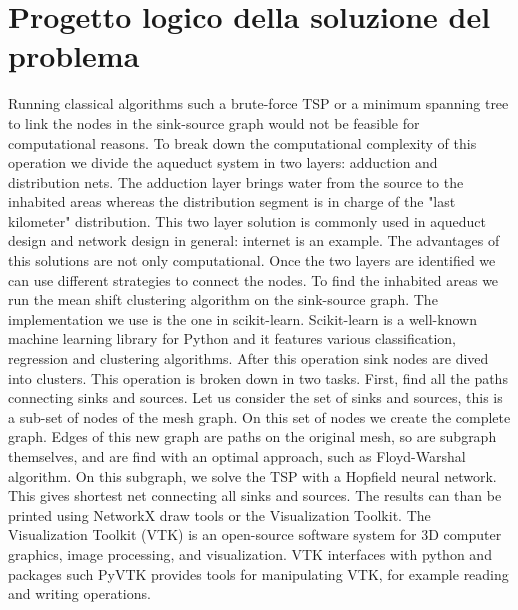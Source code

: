 \chapter{Progetto logico della soluzione del problema}
\label{capitolo4}
\thispagestyle{empty}



\noindent Running classical algorithms such a brute-force TSP or a minimum spanning tree to link
the nodes in the sink-source graph would not be feasible for computational reasons. To
break down the computational complexity of this operation we divide the aqueduct system
in two layers: adduction and distribution nets. The adduction layer brings water from the
source to the inhabited areas whereas the distribution segment is in charge of the "last
kilometer" distribution. This two layer solution is commonly used in aqueduct design and
network design in general: internet is an example. The advantages of this solutions are
not only computational. Once the two layers are identified we can use different strategies
to connect the nodes.
To find the inhabited areas we run the mean shift clustering algorithm on the sink-source
graph. The implementation we use is the one in scikit-learn. Scikit-learn is a well-known
machine learning library for Python and it features various classification, regression and
clustering algorithms. After this operation sink nodes are dived into clusters.
This operation is broken down in two tasks. First, find all the paths connecting sinks
and sources. Let us consider the set of sinks and sources, this is a sub-set of nodes of the
mesh graph. On this set of nodes we create the complete graph. Edges of this new graph
are paths on the original mesh, so are subgraph themselves, and are find with an optimal
approach, such as Floyd-Warshal algorithm. On this subgraph, we solve the TSP with a
Hopfield neural network. This gives shortest net connecting all sinks and sources.
The results can than be printed using NetworkX draw tools or the Visualization Toolkit.
The Visualization Toolkit (VTK) is an open-source software system for 3D computer
graphics, image processing, and visualization. VTK interfaces with python and packages
such PyVTK provides tools for manipulating VTK, for example reading and writing
operations.
